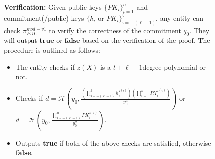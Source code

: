 \begin{figure}[ht]
{\begin{tcolorbox}[title=\textbf{$\Lambda_{RO}^{packed-compact}$}, width=1.2\textwidth, colframe=blue!75!black, colback=blue!10, sharp corners]
        \vspace{0.5em}
        \textbf{Verification:}
            Given public keys $\{PK_i\}_{i=1}^n$ and commitment(/public) keys $\{h_i\text{ or }PK_i\}_{i=-(\ell-1)}^0$, any entity can check 
            $\pi_{PDL}^{mod-v1}$ to verify the correctness of the commitment $y_0$. 
            They will output \textbf{true} or \textbf{false} based on the verification of the proof. The 
            procedure is outlined as follows:
        \begin{itemize}
            \item The entity checks if $z(X)$ is a $t+\ell-1$degree polynomial or not.
            \item Checks if $d=\mathcal{H}(y_0,\frac{(\prod_{i=-(\ell-1)}^{0}h_i^{z(i)})(\prod_{i=1}^{n}PK_i^{z(i)})}{y_0^d})$ or 
            $d=\mathcal{H}(y_0,\frac{\prod_{i=-(\ell-1)}^{n}PK_i^{z(i)}}{y_0^d})$.
            \item Outputs \textbf{true} if both of the above checks are satisfied, otherwise \textbf{false}.
        \end{itemize}


\end{tcolorbox}}
\end{figure}
